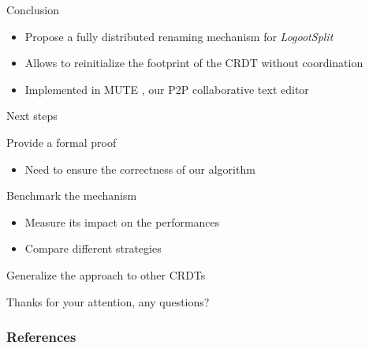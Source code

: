 \documentclass[10pt]{beamer}
\begin{document}
\begin{frame}{Conclusion}
  \begin{itemize}
    \item Propose a fully distributed renaming mechanism for \emph{LogootSplit}
    \item Allows to reinitialize the footprint of the \ac{CRDT} without coordination

    \bigskip

    \item Implemented in MUTE \cite{nicolas:hal-01655438}, our P2P collaborative text editor
  \end{itemize}
\end{frame}

\begin{frame}{Next steps}

  \begin{block}{Provide a formal proof}
    \begin{itemize}
      \item Need to ensure the correctness of our algorithm
    \end{itemize}
  \end{block}

  \medskip

  \begin{block}{Benchmark the mechanism}
    \begin{itemize}
      \item Measure its impact on the performances
      \item Compare different strategies
    \end{itemize}
  \end{block}

  \medskip

  \begin{block}{Generalize the approach to other \acp{CRDT}}
  \end{block}
\end{frame}

\begin{frame}[standout]
  Thanks for your attention, any questions?
  \vspace{3em}
  \begin{center}
    \ccby
  \end{center}
\end{frame}

\begin{frame}[allowframebreaks]
  \frametitle{References}
  
  
\end{frame}
\end{document}
